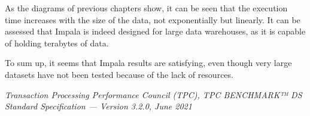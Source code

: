 \documentclass{article}
\begin{document}
As the diagrams of previous chapters show, it can be seen that the execution time increases with the size of the data, not exponentially but linearly. It can be assessed that Impala is indeed designed for large data warehouses, as it is capable of holding terabytes of data.

To sum up, it seems that Impala results are satisfying, even though very large datasets have not been tested because of the lack of resources.



\begin{thebibliography}{99}
     \emph{Transaction Processing Performance Council (TPC), TPC BENCHMARK™ DS Standard Specification — Version 3.2.0, June 2021}
    
\end{thebibliography}
\end{document}
